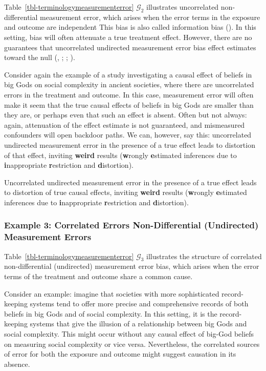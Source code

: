 \documentclass[
  single column]{article}
\begin{document}
Table~\ref{tbl-terminologymeasurementerror} \(\mathcal{G}_2\)
illustrates uncorrelated non-differential measurement error, which
arises when the error terms in the exposure and outcome are independent
This bias is also called information bias
(). In this
setting, bias will often attenuate a true treatment effect. However,
there are no guarantees that uncorrelated undirected measurement error
bias effect estimates toward the null
(,
;
;
).

Consider again the example of a study investigating a causal effect of
beliefs in big Gods on social complexity in ancient societies, where
there are uncorrelated errors in the treatment and outcome. In this
case, measurement error will often make it seem that the true causal
effects of beliefs in big Gods are smaller than they are, or perhaps
even that such an effect is absent. Often but not always: again,
attenuation of the effect estimate is not guaranteed, and mismeasured
confounders will open backdoor paths. We can, however, say this:
uncorrelated undirected measurement error in the presence of a true
effect leads to distortion of that effect, inviting \textbf{weird}
results (\textbf{w}rongly \textbf{e}stimated inferences due to
\textbf{i}nappropriate \textbf{r}estriction and \textbf{d}istortion).

Uncorrelated undirected measurement error in the presence of a true
effect leads to distortion of true causal effects, inviting
\textbf{weird} results (\textbf{w}rongly \textbf{e}stimated inferences
due to \textbf{i}nappropriate \textbf{r}estriction and
\textbf{d}istortion).

\subsubsection{Example 3: Correlated Errors Non-Differential
(Undirected) Measurement
Errors}\label{example-3-correlated-errors-non-differential-undirected-measurement-errors}

Table~\ref{tbl-terminologymeasurementerror} \(\mathcal{G}_3\)
illustrates the structure of correlated non-differential (undirected)
measurement error bias, which arises when the error terms of the
treatment and outcome share a common cause.

Consider an example: imagine that societies with more sophisticated
record-keeping systems tend to offer more precise and comprehensive
records of both beliefs in big Gods and of social complexity. In this
setting, it is the record-keeping systems that give the illusion of a
relationship between big Gods and social complexity. This might occur
without any causal effect of big-God beliefs on measuring social
complexity or vice versa. Nevertheless, the correlated sources of error
for both the exposure and outcome might suggest causation in its
absence.
\end{document}
